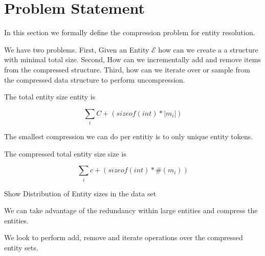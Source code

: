 
\section{Problem Statement}

In this section we formally define the compression problem for
entity resolution.

We have two problems.
First, Given an Entity $\mathcal{E}$ how can we create a
a structure with minimal total size.
Second, How can we incrementally add and remove items 
from the compressed structure.
Third, how can we iterate over or sample from the
compressed data structure to perform uncompression.

The total entity size entity is 

$$ \sum_i C + (sizeof(int) * |m_i|) $$  

The smallest compression we can do per entitiy is to only unique entity tokens.

The compressed total entity size size is

$$ \sum_i c + (sizeof(int) * \#(m_i) ) $$ 


Show Distribution of Entity sizes in the data set

We can take advantage of the redundancy within
large entities and compress the entities.

We look to perform add, remove and iterate operations
over the compressed entity sets.  




